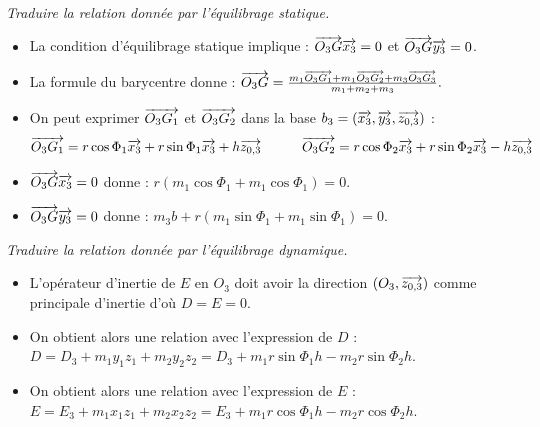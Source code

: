 \documentclass[10pt,fleqn]{article} %
\begin{document}
\begin{exemple}
~\\

 \textit{Traduire la relation donnée par l'équilibrage statique.}
\ifprof
\begin{itemize}
\item La condition d'équilibrage statique implique : $\overrightarrow{O_3G} \overrightarrow{x_3}=0$ et $\overrightarrow{O_3G} \overrightarrow{y_3}=0$.
\item La formule du barycentre donne : 
$
\overrightarrow{O_3G}=\frac{m_1 \overrightarrow{O_3G_1}+m_1 \overrightarrow{O_3G_2}+m_3 \overrightarrow{O_3G_3}}{m_1+m_2+m_3}.
$
\item On peut exprimer $\overrightarrow{O_3G_1}$ et $\overrightarrow{O_3G_2}$ dans la base $b_3=\left(\overrightarrow{{x_3}},\overrightarrow{{y}_3},\overrightarrow{{z}_{0,3}} \right)$ :
$$
\overrightarrow{O_3G_1}=r \cos\Phi_1 \overrightarrow{x_3}+r \sin\Phi_1 \overrightarrow{x_3}+h \overrightarrow{z_{0,3}}
\quad\quad\quad
\overrightarrow{O_3G_2}=r \cos\Phi_2 \overrightarrow{x_3}+r \sin\Phi_2 \overrightarrow{x_3}-h \overrightarrow{z_{0,3}}
$$

\item $\overrightarrow{O_3G} \overrightarrow{x_3}=0$ donne : 
$
r \left(m_1 \cos\Phi_1+m_1 \cos\Phi_1 \right)=0$.
\item $\overrightarrow{O_3G} \overrightarrow{y_3}=0$ donne : 
$
m_3 b+r \left(m_1 \sin\Phi_1+m_1 \sin\Phi_1 \right)=0
$.
\end{itemize}
\else
\fi

\textit{Traduire la relation donnée par l'équilibrage dynamique.}

\ifprof
\begin{itemize}
\item L'opérateur d'inertie de $E$ en $O_3$ doit avoir la direction $\left(O_3,\overrightarrow{{z_{0,3}}}\right)$  comme principale d'inertie d'où $D=E=0$.
\item On obtient alors une relation avec l'expression de $D$ : 
$
D=D_3+m_1 y_1 z_1+ m_2 y_2 z_2=D_3+m_1 r \sin\Phi_1 h-m_2 r \sin\Phi_2 h
$.
\item On obtient alors une relation avec l'expression de $E$ :
$E=E_3+m_1 x_1 z_1+m_2 x_2 z_2=E_3+m_1 r \cos\Phi_1 h-m_2 r \cos\Phi_2 h
$.
\end{itemize}
\else
\fi

\end{exemple}
\end{document}
